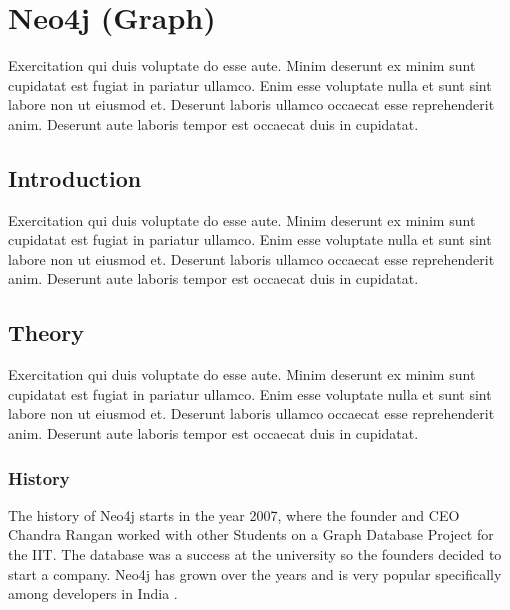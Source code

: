 
\chapter{Neo4j (Graph)} \label{ch:neo4j}

Exercitation qui duis voluptate do esse aute. Minim deserunt ex minim sunt cupidatat est fugiat in pariatur ullamco. Enim esse voluptate nulla et sunt sint labore non ut eiusmod et. Deserunt laboris ullamco occaecat esse reprehenderit anim. Deserunt aute laboris tempor est occaecat duis in cupidatat.

\section{Introduction} \label{sec:introductionNeo4j}

Exercitation qui duis voluptate do esse aute. Minim deserunt ex minim sunt cupidatat est fugiat in pariatur ullamco. Enim esse voluptate nulla et sunt sint labore non ut eiusmod et. Deserunt laboris ullamco occaecat esse reprehenderit anim. Deserunt aute laboris tempor est occaecat duis in cupidatat.

\section{Theory} \label{sec:theoryNeo4j}

Exercitation qui duis voluptate do esse aute. Minim deserunt ex minim sunt cupidatat est fugiat in pariatur ullamco. Enim esse voluptate nulla et sunt sint labore non ut eiusmod et. Deserunt laboris ullamco occaecat esse reprehenderit anim. Deserunt aute laboris tempor est occaecat duis in cupidatat.

\subsection{History} \label{subsec:historyNeo4j}

The history of Neo4j starts in the year 2007, where the founder and CEO Chandra Rangan worked with other Students on a Graph Database Project for the \ac{IIT}. The database was a success at the university so the founders
decided to start a company. Neo4j has grown over the years and is very popular specifically among developers in India \parencite{historyneo4j}.

